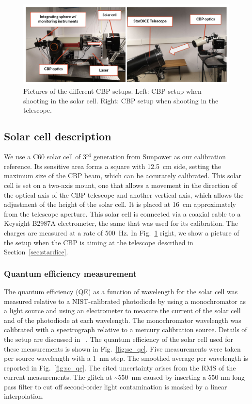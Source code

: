 \begin{figure}%
\centering
\includegraphics[width=\textwidth]{fig/cbp_setup_cropped.pdf}
\caption{Pictures of the different CBP setups. Left: CBP setup when shooting in the solar cell. Right: CBP setup when shooting in the \SD telescope.}
\label{fig:cbp_setup}
\end{figure}

\subsection{Solar cell description}
\label{sec:solarcell}

We use a C60 solar cell of 3$^{\mathrm{rd}}$ generation from Sunpower as our calibration reference. Its sensitive area forms a square with \SI{12.5}{\centi\meter} side, setting the maximum size of the CBP beam, which can be accurately calibrated. This solar cell is set on a two-axis mount, one that allows a movement in the direction of the optical axis of the CBP telescope and another vertical axis, which allows the adjustment of the height of the solar cell. It is placed at \SI{16}{\cm} approximately from the telescope aperture. This solar cell is connected via a coaxial cable to a Keysight B2987A electrometer, the same that was used for its calibration. The charges are measured at a rate of \SI{500}{\hertz}. In Fig.~\ref{fig:cbp_setup} right, we show a picture of the setup when the CBP is aiming at the \SD telescope described in Section~\ref{sec:stardice}.


\subsubsection{Quantum efficiency measurement}
 
The quantum efficiency (QE) as a function of wavelength for the solar cell was
measured relative to a NIST-calibrated photodiode by using a monochromator as a
light source and using an electrometer to measure the current of the solar cell
and of the photodiode at each wavelength. The monochromator wavelength was
calibrated with a spectrograph relative to a mercury calibration source. Details
of the setup are discussed in ~\cite{solarcell}. The quantum efficiency of the
solar cell used for these measurements is shown in Fig.~\ref{fig:sc_qe}. Five
measurements were taken per source wavelength with a \SI{1}{\nm} step. The
smoothed average per wavelength is reported in Fig.~\ref{fig:sc_qe}. The cited
uncertainty arises from the RMS of the current measurements. The glitch at
\textasciitilde\SI{550}{\nm} caused by inserting a 550 nm long pass
filter to cut off second-order light contamination is masked by a linear
interpolation.

